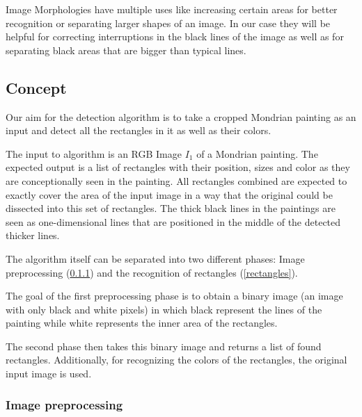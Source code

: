 Image Morphologies have multiple uses like increasing certain areas for better
recognition or separating larger shapes of an image. In our case they will be
helpful for correcting interruptions in the black lines of the image as well as
for separating black areas that are bigger than typical lines.


\subsection{Concept}


Our aim for the detection algorithm is to take a cropped Mondrian painting as
an input and detect all the rectangles in it as well as their colors.

The input to algorithm is an RGB Image $I_1$ of a Mondrian painting. The
expected output is a list of rectangles with their position, sizes and color as
they are conceptionally seen in the painting. All rectangles combined are
expected to exactly cover the area of the input image in a way that the original
could be dissected into this set of rectangles. The thick black lines in the
paintings are seen as one-dimensional lines that are positioned in the middle
of the detected thicker lines.

The algorithm itself can be separated into two different phases: Image
preprocessing (\ref{preprocessing}) and the recognition of rectangles (\ref{rectangles}).

The goal of the first preprocessing phase is to obtain a binary image (an image
with only black and white pixels) in which black represent the lines of the
painting while white represents the inner area of the rectangles.

The second phase then takes this binary image and returns a list of found
rectangles. Additionally, for recognizing the colors of the rectangles, the
original input image is used.

\subsubsection{Image preprocessing} \label{preprocessing}

